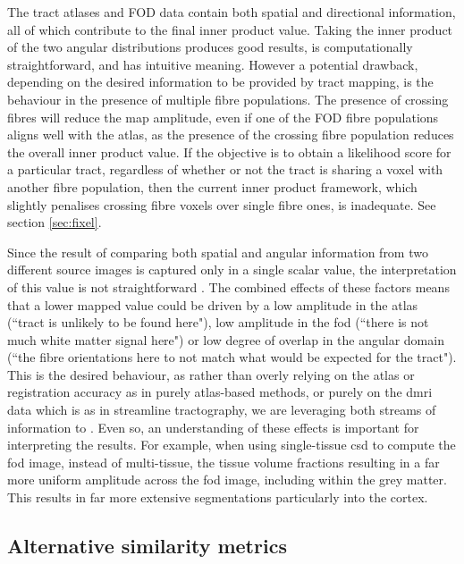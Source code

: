 The tract atlases and FOD data contain both spatial and directional information, all of which contribute to the final inner product value.
Taking the inner product of the two angular distributions produces good results, is computationally straightforward, and has intuitive meaning.
However a potential drawback, depending on the desired information to be provided by tract mapping, is the behaviour in the presence of multiple fibre populations.
The presence of crossing fibres will reduce the map amplitude, even if one of the FOD fibre populations aligns well with the atlas, as the presence of the crossing fibre population reduces the overall inner product value.
If the objective is to obtain a likelihood score for a particular tract, regardless of whether or not the tract is sharing a voxel with another fibre population, then the current inner product framework, which slightly penalises crossing fibre voxels over single fibre ones, is inadequate. 
See section \ref{sec:fixel}.

Since the result of comparing both spatial and angular information from two different source images is captured only in a single scalar value, the interpretation of this value is not straightforward .
The combined effects of these factors means that a lower mapped value could be driven by a low amplitude in the atlas (``tract is unlikely to be found here"), low amplitude in the \gls{fod} (``there is not much white matter signal here") or low degree of overlap in the angular domain (``the fibre orientations here to not match what would be expected for the tract").
This is the desired behaviour, as rather than overly relying on the atlas or registration accuracy as in purely atlas-based methods, or purely on the \gls{dmri} data which is  as in streamline tractography, we are leveraging both streams of information to .
Even so, an understanding of these effects is important for interpreting the results.
For example, when using single-tissue \gls{csd} to compute the \gls{fod} image, instead of multi-tissue, the tissue volume fractions  resulting in a far more uniform amplitude across the \gls{fod} image, including within the grey matter.
This results in far more extensive segmentations particularly into the cortex. 

\subsection{Alternative similarity metrics}

